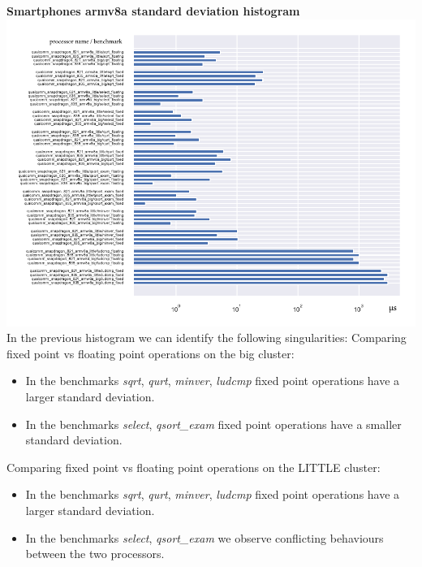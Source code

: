 \clearpage
\textbf{Smartphones armv8a standard deviation histogram}\newline
\hspace*{-3.2cm}
\includegraphics[width=570pt]{smartphones_stddev_histogram.pdf}\\[4cm]
In the previous histogram we can identify the following singularities:
Comparing fixed point vs floating point operations on the big cluster:
\begin{itemize}
		\item In the benchmarks \textit{sqrt}, \textit{qurt}, \textit{minver}, \textit{ludcmp} fixed point operations have a larger standard deviation.
		\item In the benchmarks \textit{select}, \textit{qsort\_exam} fixed point operations have a smaller standard deviation.
\end{itemize}
Comparing fixed point vs floating point operations on the LITTLE cluster:
\begin{itemize}
		\item In the benchmarks \textit{sqrt}, \textit{qurt}, \textit{minver}, \textit{ludcmp} fixed point operations have a larger standard deviation.
		\item In the benchmarks \textit{select}, \textit{qsort\_exam} we observe conflicting behaviours between the two processors.
\end{itemize}

